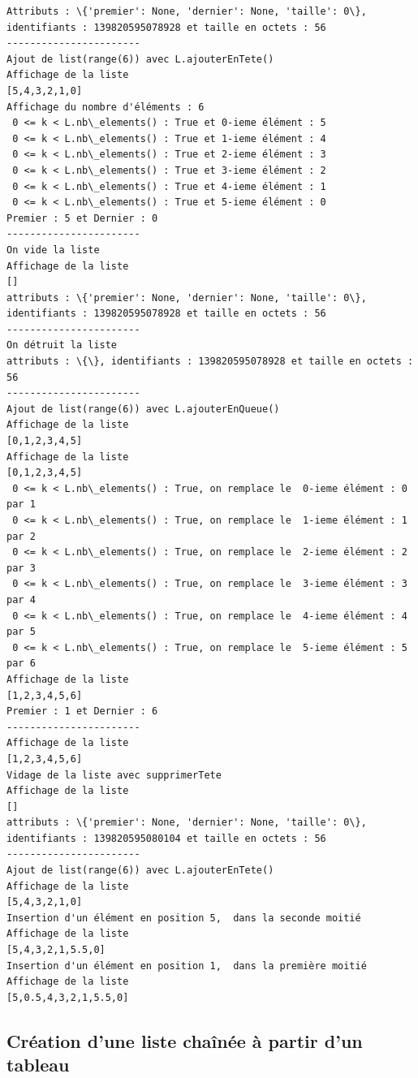\documentclass[11pt]{article}
\begin{document}
    \begin{Verbatim}[commandchars=\\\{\}]
Attributs : \{'premier': None, 'dernier': None, 'taille': 0\}, identifiants : 139820595078928 et taille en octets : 56
-----------------------
Ajout de list(range(6)) avec L.ajouterEnTete()
Affichage de la liste
[5,4,3,2,1,0]
Affichage du nombre d'éléments : 6
 0 <= k < L.nb\_elements() : True et 0-ieme élément : 5
 0 <= k < L.nb\_elements() : True et 1-ieme élément : 4
 0 <= k < L.nb\_elements() : True et 2-ieme élément : 3
 0 <= k < L.nb\_elements() : True et 3-ieme élément : 2
 0 <= k < L.nb\_elements() : True et 4-ieme élément : 1
 0 <= k < L.nb\_elements() : True et 5-ieme élément : 0
Premier : 5 et Dernier : 0 
-----------------------
On vide la liste
Affichage de la liste
[]
attributs : \{'premier': None, 'dernier': None, 'taille': 0\}, identifiants : 139820595078928 et taille en octets : 56
-----------------------
On détruit la liste
attributs : \{\}, identifiants : 139820595078928 et taille en octets : 56
-----------------------
Ajout de list(range(6)) avec L.ajouterEnQueue()
Affichage de la liste
[0,1,2,3,4,5]
Affichage de la liste
[0,1,2,3,4,5]
 0 <= k < L.nb\_elements() : True, on remplace le  0-ieme élément : 0 par 1  
 0 <= k < L.nb\_elements() : True, on remplace le  1-ieme élément : 1 par 2  
 0 <= k < L.nb\_elements() : True, on remplace le  2-ieme élément : 2 par 3  
 0 <= k < L.nb\_elements() : True, on remplace le  3-ieme élément : 3 par 4  
 0 <= k < L.nb\_elements() : True, on remplace le  4-ieme élément : 4 par 5  
 0 <= k < L.nb\_elements() : True, on remplace le  5-ieme élément : 5 par 6  
Affichage de la liste
[1,2,3,4,5,6]
Premier : 1 et Dernier : 6 
-----------------------
Affichage de la liste
[1,2,3,4,5,6]
Vidage de la liste avec supprimerTete
Affichage de la liste
[]
attributs : \{'premier': None, 'dernier': None, 'taille': 0\}, identifiants : 139820595080104 et taille en octets : 56
-----------------------
Ajout de list(range(6)) avec L.ajouterEnTete()
Affichage de la liste
[5,4,3,2,1,0]
Insertion d'un élément en position 5,  dans la seconde moitié
Affichage de la liste
[5,4,3,2,1,5.5,0]
Insertion d'un élément en position 1,  dans la première moitié
Affichage de la liste
[5,0.5,4,3,2,1,5.5,0]

    \end{Verbatim}

    \hypertarget{cruxe9ation-dune-liste-chauxeenuxe9e-uxe0-partir-dun-tableau}{%
\subsection{Création d'une liste chaînée à partir d'un
tableau}\label{cruxe9ation-dune-liste-chauxeenuxe9e-uxe0-partir-dun-tableau}}
\end{document}
